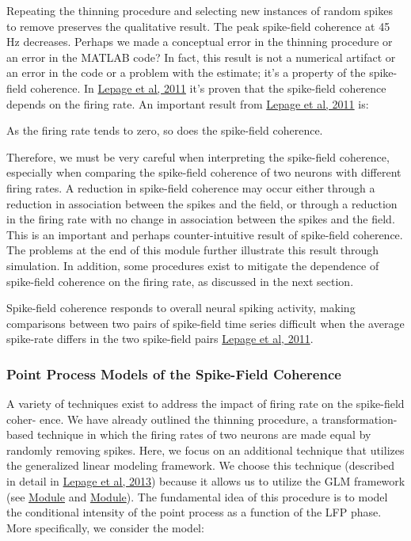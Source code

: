 \documentclass[11pt]{article}
\begin{document}
    Repeating the thinning procedure and selecting new instances of random
spikes to remove preserves the qualitative result. The peak spike-field
coherence at 45 Hz decreases. Perhaps we made a conceptual error in the
thinning procedure or an error in the MATLAB code? In fact, this result
is not a numerical artifact or an error in the code or a problem with
the estimate; it's a property of the spike-field coherence. In
\href{https://www.ncbi.nlm.nih.gov/pubmed/21671792}{Lepage et al, 2011}
it's proven that the spike-field coherence depends on the firing rate.
An important result from
\href{https://www.ncbi.nlm.nih.gov/pubmed/21671792}{Lepage et al, 2011}
is:

    As the firing rate tends to zero, so does the spike-field coherence.

    Therefore, we must be very careful when interpreting the spike-field
coherence, especially when comparing the spike-field coherence of two
neurons with different firing rates. A reduction in spike-field
coherence may occur either through a reduction in association between
the spikes and the field, or through a reduction in the firing rate with
no change in association between the spikes and the field. This is an
important and perhaps counter-intuitive result of spike-field coherence.
The problems at the end of this module further illustrate this result
through simulation. In addition, some procedures exist to mitigate the
dependence of spike-field coherence on the firing rate, as discussed in
the next section.

    Spike-field coherence responds to overall neural spiking activity,
making comparisons between two pairs of spike-field time series
difficult when the average spike-rate differs in the two spike-field
pairs \href{https://www.ncbi.nlm.nih.gov/pubmed/21671792}{Lepage et al,
2011}.

    \subsubsection{Point Process Models of the Spike-Field
Coherence}\label{point-process-models-of-the-spike-field-coherence}

A variety of techniques exist to address the impact of firing rate on
the spike-field coher- ence. We have already outlined the thinning
procedure, a transformation-based technique in which the firing rates of
two neurons are made equal by randomly removing spikes. Here, we focus
on an additional technique that utilizes the generalized linear modeling
framework. We choose this technique (described in detail in
\href{https://www.ncbi.nlm.nih.gov/pmc/articles/PMC3800189/}{Lepage et
al, 2013}) because it allows us to utilize the GLM framework (see
\href{to\%20add}{Module} and \href{to\%20add}{Module}). The fundamental
idea of this procedure is to model the conditional intensity of the
point process as a function of the LFP phase. More specifically, we
consider the model:
\end{document}
